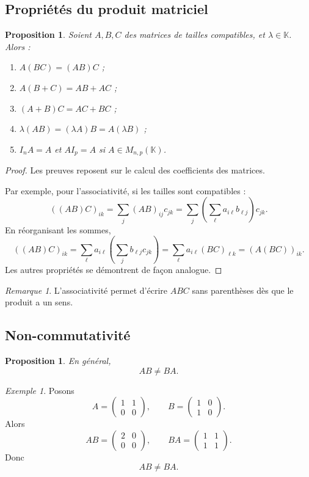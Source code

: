\documentclass[11pt,a4paper]{article}
\newtheorem{proposition}[definition]{Proposition}
\theoremstyle{remark}
\newtheorem{remarque}[definition]{Remarque}
\newtheorem{exemple}[definition]{Exemple}
\newcommand{\K}{\mathbb{K}}
\begin{document}
\subsection{Propriétés du produit matriciel}

\begin{proposition}
Soient \(A,B,C\) des matrices de tailles compatibles, et \(\lambda\in\K\). Alors :
\begin{enumerate}[label=\arabic*)]
    \item \(A(BC)=(AB)C\) ;
    \item \(A(B+C)=AB+AC\) ;
    \item \((A+B)C=AC+BC\) ;
    \item \(\lambda(AB)=(\lambda A)B=A(\lambda B)\) ;
    \item \(I_nA=A\) et \(AI_p=A\) si \(A\in M_{n,p}(\K)\).
\end{enumerate}
\end{proposition}

\begin{proof}
Les preuves reposent sur le calcul des coefficients des matrices.

Par exemple, pour l’associativité, si les tailles sont compatibles :
\[
((AB)C)_{ik}
=
\sum_{j} (AB)_{ij}c_{jk}
=
\sum_j \left(\sum_\ell a_{i\ell}b_{\ell j}\right)c_{jk}.
\]
En réorganisant les sommes,
\[
((AB)C)_{ik}
=
\sum_\ell a_{i\ell}\left(\sum_j b_{\ell j}c_{jk}\right)
=
\sum_\ell a_{i\ell}(BC)_{\ell k}
=
(A(BC))_{ik}.
\]
Les autres propriétés se démontrent de façon analogue.
\end{proof}

\begin{remarque}
L’associativité permet d’écrire \(ABC\) sans parenthèses dès que le produit a un sens.
\end{remarque}

\subsection{Non-commutativité}

\begin{proposition}
En général,
\[
AB\neq BA.
\]
\end{proposition}

\begin{exemple}
Posons
\[
A=
\begin{pmatrix}
1 & 1\\
0 & 0
\end{pmatrix},
\qquad
B=
\begin{pmatrix}
1 & 0\\
1 & 0
\end{pmatrix}.
\]
Alors
\[
AB=
\begin{pmatrix}
2 & 0\\
0 & 0
\end{pmatrix},
\qquad
BA=
\begin{pmatrix}
1 & 1\\
1 & 1
\end{pmatrix}.
\]
Donc
\[
AB\neq BA.
\]
\end{exemple}
\end{document}
